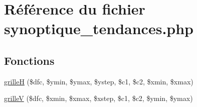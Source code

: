 \hypertarget{synoptique__tendances_8php}{
\section{R\'{e}f\'{e}rence du fichier synoptique\_\-tendances.php}
\label{synoptique__tendances_8php}
}
\subsection*{Fonctions}
\begin{CompactItemize}
\item 
\hyperlink{synoptique__tendances_8php_a25}{grille\-H} (\$dfc, \$ymin, \$ymax, \$ystep, \$c1, \$c2, \$xmin, \$xmax)
\item 
\hyperlink{synoptique__tendances_8php_a26}{grille\-V} (\$dfc, \$xmin, \$xmax, \$xstep, \$c1, \$c2, \$ymin, \$ymax)
\end{CompactItemize}
